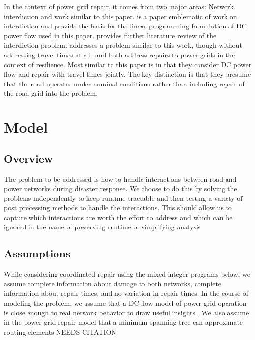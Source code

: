 \documentclass[10pt]{article}
\begin{document}
In the context of power grid repair, it comes from two major areas: Network interdiction and work similar to this paper. \cite{SalmeronEA2010} is a paper emblematic of work on interdiction and provide the basis for the linear programming formulation of DC power flow used in this paper. \cite{Wood2011} provides further literature review of the interdiction problem. \cite{NPSMasters} addresses a problem similar to this work, though without addressing travel times at all. \cite{ArabEA2015} and \cite{MousavizadehEA2018} both address repairs to power grids in the context of resilience. Most similar to this paper is \cite{BentEA2011} in that they consider DC power flow and repair with travel times jointly. The key distinction is that they presume that the road operates under nominal conditions rather than including repair of the road grid into the problem.

\section{\large{Model}}
\vspace*{-12pt}
\subsection{Overview}
The problem to be addressed is how to handle interactions between road and power networks during disaster response. We choose to do this by solving the problems independently to keep runtime tractable and then testing a variety of post processing methods to handle the interactions. This should allow us to capture which interactions are worth the effort to address and which can be ignored in the name of preserving runtime or simplifying analysis
\subsection{Assumptions}
\vspace*{-12pt}
While considering coordinated repair using the mixed-integer programs below, we assume complete information about damage to both networks, complete information about repair times, and no variation in repair times. In the course of modeling the problem, we assume that a DC-flow model of power grid operation is close enough to real network behavior to draw useful insights \cite{QiEA2012}. We also assume in the power grid repair model that a minimum spanning tree can approximate routing elements NEEDS CITATION 
\end{document}

